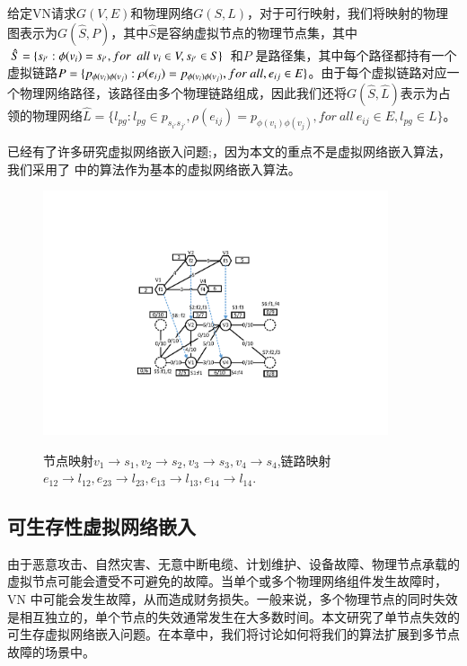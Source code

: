 给定VN请求$G(V,E)$和物理网络$G(S,L)$，对于可行映射，我们将映射的物理图表示为$G\left( {\hat S,P} \right)$，其中$\hat S$是容纳虚拟节点的物理节点集，其中$\hat S = \{ {s_{i'}}:\phi({v_i}) = {s_{i'}},for\ \ {\rm{ }}all\ {v_i} \in V,{s_{i'}} \in S\}$ 和$P$ 是路径集，其中每个路径都持有一个虚拟链路$P = \{ p_{\phi({v_i}) \phi({v_j})}:\rho(e_{ij}) = p_{\phi({v_i}) \phi({v_j})}{\rm{ }}, for\ all,{e_{ij}} \in E\}$。由于每个虚拟链路对应一个物理网络路径，该路径由多个物理链路组成，因此我们还将$G\left( {\hat S,\hat L} \right)$表示为占领的物理网络$\hat L = \{ {l_{pg}}:{l_{pg}} \in {p_{s_{i'}s_{j'}}}, \rho(e_{ij}) = p_{\phi({v_i}) \phi({v_j})},for\ all\ {e_{ij}} \in E,{l_{pg}} \in L\}$。

已经有了许多研究虚拟网络嵌入问题\cite{fischer2013virtual};，因为本文的重点不是虚拟网络嵌入算法，我们采用了\cite{lischka2009virtual} 中的算法作为基本的虚拟网络嵌入算法。


\begin{figure}
\centering
\includegraphics[width=4in]{figures/VirtualNetworkEmbedding}\\
\caption{节点映射$v_1\rightarrow s_1, v_2\rightarrow s_2, v_3\rightarrow s_3, v_4\rightarrow s_4$,链路映射$e_{12}\rightarrow l_{12},e_{23}\rightarrow l_{23},e_{13}\rightarrow l_{13},e_{14}\rightarrow l_{14}$.}\label{fig:VirtualNetworkEmbedding}
\end{figure}
\subsection{可生存性虚拟网络嵌入}
由于恶意攻击、自然灾害、无意中断电缆、计划维护、设备故障、物理节点承载的虚拟节点可能会遭受不可避免的故障。当单个或多个物理网络组件发生故障时，VN 中可能会发生故障，从而造成财务损失。一般来说，多个物理节点的同时失效是相互独立的，单个节点的失效通常发生在大多数时间\cite{yeow2010designing}。本文研究了单节点失效的可生存虚拟网络嵌入问题。在本章中，我们将讨论如何将我们的算法扩展到多节点故障的场景中。

